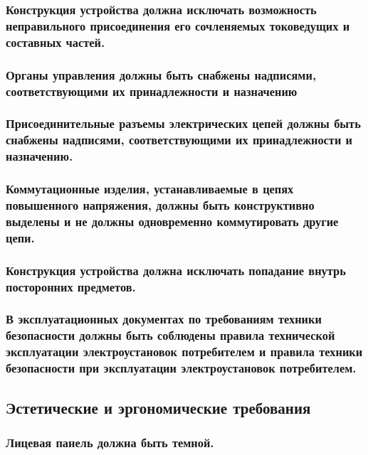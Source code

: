 \documentclass[a4paper]{bsuir-tor}
\begin{document}
 \subsubsection{Конструкция устройства должна исключать
   возможность неправильного присоединения
   его сочленяемых токоведущих и составных частей.}
 
 \subsubsection{Органы управления должны быть снабжены надписями,
   соответствующими их принадлежности и назначению}

 \subsubsection{Присоединительные разъемы электрических цепей
   должны быть снабжены надписями,
   соответствующими их принадлежности и назначению.}

 \subsubsection{Коммутационные изделия,
   устанавливаемые в цепях повышенного напряжения,
   должны быть конструктивно выделены
   и не должны одновременно коммутировать другие цепи.}

 \subsubsection{Конструкция устройства должна исключать попадание
   внутрь посторонних предметов.}

\subsubsection{В эксплуатационных документах по требованиям
  техники безопасности должны быть соблюдены правила технической
  эксплуатации электроустановок потребителем и правила техники
  безопасности при эксплуатации электроустановок потребителем.}

\subsection{Эстетические и эргономические требования}

\subsubsection{Лицевая панель должна быть темной.}
\end{document}
